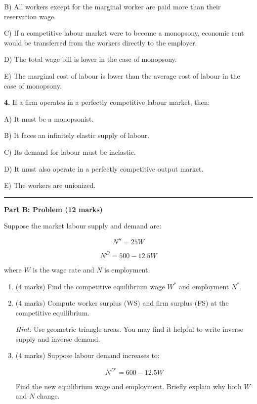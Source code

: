 \documentclass[12pt]{article}
\begin{document}
B) All workers except for the marginal worker are paid more than their reservation wage.

C) If a competitive labour market were to become a monopsony, economic rent would be transferred from the workers directly to the employer.

D) The total wage bill is lower in the case of monopsony.

E) The marginal cost of labour is lower than the average cost of labour in the case of monopsony.

\newpage


\textbf{4.} If a firm operates in a perfectly competitive labour market, then:

A) It must be a monopsonist.

B) It faces an infinitely elastic supply of labour.

C) Its demand for labour must be inelastic.

D) It must also operate in a perfectly competitive output market.

E) The workers are unionized.

\vspace{0.8em}

\hrule
\vspace{0.6em}

\textbf{Part B: Problem (12 marks)}

Suppose the market labour supply and demand are:

\[
N^S = 25W
\]

\[
N^D = 500 - 12.5W
\]

where $W$ is the wage rate and $N$ is employment.

\begin{enumerate}

\item[(a)] (4 marks) Find the competitive equilibrium wage $W^*$ and employment $N^*$.

\item[(b)] (4 marks) Compute worker surplus (WS) and firm surplus (FS) at the competitive equilibrium. 

\textit{Hint:} Use geometric triangle areas. You may find it helpful to write inverse supply and inverse demand.

\item[(c)] (4 marks) Suppose labour demand increases to:

\[
N^{D'} = 600 - 12.5W
\]

Find the new equilibrium wage and employment. Briefly explain why both $W$ and $N$ change.

\end{enumerate}
\end{document}

